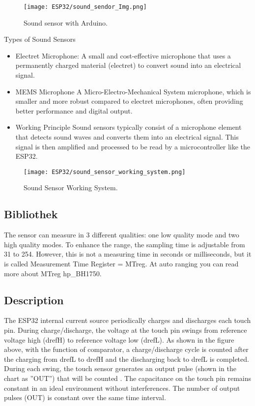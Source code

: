 \begin{figure}  
	\begin{center}
		\texttt{[image: ESP32/sound\_sendor\_Img.png]}
		\caption{Sound sensor with Arduino.} 
		\label{fig:Python 3.10.}
	\end{center}
\end{figure}	


Types of Sound Sensors
\begin{itemize}
	\item Electret Microphone:
	A small and cost-effective microphone that uses a permanently charged material (electret) to convert sound into an electrical signal.
	
	\item MEMS Microphone
	A Micro-Electro-Mechanical System microphone, which is smaller and more robust compared to electret microphones, often providing better performance and digital output.
	
	\item Working Principle
	Sound sensors typically consist of a microphone element that detects sound waves and converts them into an electrical signal. This signal is then amplified and processed to be read by a microcontroller like the ESP32.
\end{itemize}



\begin{figure}  
	\begin{center}
		\texttt{[image: ESP32/sound\_sensor\_working\_system.png]}
		\caption{Sound Sensor Working System.} 
		\label{fig:Python 3.10.}
	\end{center}
\end{figure}	

\subsection{Bibliothek}

The sensor can measure in 3 different qualities: one low quality mode and two high quality modes.
To enhance the range, the sampling time is adjustable from 31 to 254.
However, this is not a measuring time in seconds or milliseconds, but it is called Measurement Time Register = MTreg. At auto ranging you can read more about \cite{Vogelgesang:2024} MTreg hp_BH1750.

\subsection{Description}
The ESP32 internal current source periodically charges and discharges each touch pin. During charge/discharge, the voltage at the touch pin swings from reference voltage high (drefH) to reference voltage low (drefL). As shown in the figure above, with the function of comparator, a charge/discharge cycle is counted after the charging from drefL to drefH and the discharging back to drefL is completed. During each swing, the touch sensor generates an output pulse (shown in the chart as ”OUT”) that will be counted \cite{Amin:2021}. The capacitance on the touch pin remains constant in an ideal environment without interferences. The number of output pulses (OUT) is constant over the same time interval.

